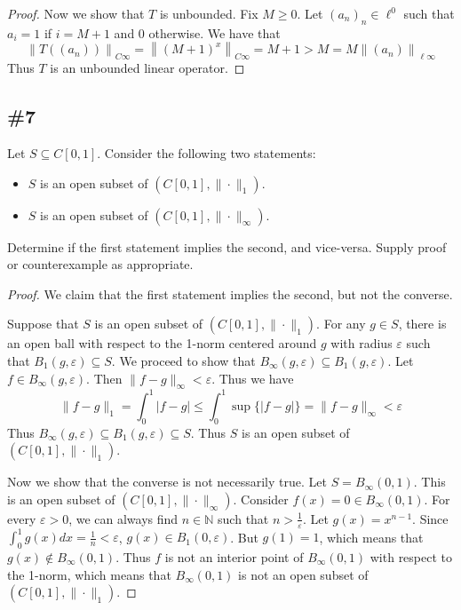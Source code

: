 \documentclass{article}
\theoremstyle{plain} %
\numberwithin{thm}{section} %
\theoremstyle{definition}
\begin{document}
\begin{enumerate}[label=(\alph*)]
\begin{proof}
                Now we show that \(T\) is unbounded. Fix \(M \geq 0\). Let \((a_n)_n \in \ell ^0\) such that \(a_i = 1\) if \(i=M+1\) and 0 otherwise. We have that
                \[
                    \left\lVert T((a_n)) \right\rVert _{C\infty} = \left\lVert (M+1)^x \right\rVert _{C\infty} = M+1 > M = M \left\lVert (a_n) \right\rVert _{\ell \infty}
                \]
                Thus \(T\) is an unbounded linear operator.

            \end{proof}
        \end{enumerate}

        \subsection{\#7}

        Let $S\subseteq C[0,1]$. Consider the following two statements:

        \begin{itemize}
            \item $S$ is an open subset of $(C[0,1],\|\cdot\|_1)$.
            \item $S$ is an open subset of $(C[0,1],\|\cdot\|_\infty)$.
        \end{itemize}
        Determine if the first statement implies the second, and vice-versa. Supply proof or counterexample as appropriate.
    
        \begin{proof}
            We claim that the first statement implies the second, but not the converse.
    
            Suppose that \(S\) is an open subset of \((C[0,1], \|\cdot\|_1)\). For any \(g \in S\), there is an open ball with respect to the 1-norm centered around \(g\) with radius \(\varepsilon\) such that \(B_1 (g, \varepsilon)\subseteq S\). We proceed to show that \(B_\infty (g, \varepsilon) \subseteq B_1 (g, \varepsilon)\). Let \(f \in B_\infty (g, \varepsilon)\). Then \(\|f-g\| _\infty < \varepsilon\). Thus we have
            \[
                \|f-g\| _1 = \int _0^1 \left\vert f-g \right\vert \leq \int _0^1 \sup \{ \left\vert f-g \right\vert \} = \|f-g\| _\infty < \varepsilon 
            \]
            Thus \(B_\infty (g, \varepsilon) \subseteq B_1 (g, \varepsilon) \subseteq S\). Thus \(S\) is an open subset of \((C[0,1], \|\cdot \| _1)\).
    
            Now we show that the converse is not necessarily true. Let \(S = B_\infty (0, 1)\). This is an open subset of \((C[0,1],\|\cdot\|_\infty)\). Consider \(f(x) = 0 \in B_\infty (0, 1)\). For every \(\varepsilon > 0\), we can always find \(n \in \mathbb{N}\) such that \(n > \frac{1}{\varepsilon}\). Let \(g(x) = x^{n-1}\). Since \(\int _0^1 g(x)dx = \frac{1}{n} < \varepsilon\), \(g(x) \in B_1(0, \varepsilon)\). But \(g(1) = 1\), which means that \(g(x) \notin B_\infty (0, 1)\). Thus \(f\) is not an interior point of \(B_\infty (0, 1)\) with respect to the 1-norm, which means that \(B_\infty (0, 1)\) is not an open subset of \((C[0,1],\|\cdot\|_1)\).
            
        \end{proof}
\end{document}
